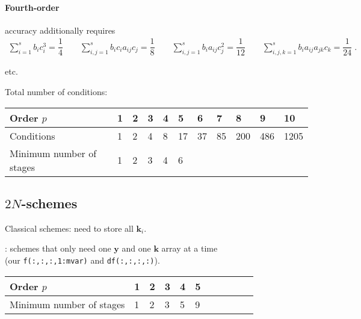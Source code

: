 \documentclass[\mydriver,12pt,twoside,notitlepage]{article}
\newcommand{\Black}{\color{black}}
\newcommand{\Code}[1]{{\color{DarkishMagenta}\texttt{#1}}}
\newcommand{\kv}      {\mathbf{k}}
\newcommand{\yv}{\mathbf{y}}
\begin{document}
%
\paragraph{Fourth-order} accuracy additionally requires
\begin{eqnarray}
  \sum\limits_{i=1}^{s} b_{i} c_i^3                  =  \dfrac{1}{4}
  \qquad
  \sum\limits_{i,j=1}^{s} b_{i} c_{i} a_{ij} c_j     =  \dfrac{1}{8}
  \qquad
  \sum\limits_{i,j=1}^{s} b_{i} a_{ij} c_j^2         =  \dfrac{1}{12}
  \qquad
  \sum\limits_{i,j,k=1}^{s} b_{i} a_{ij} a_{jk} c_k  =  \dfrac{1}{24} \; .  
\end{eqnarray}

\medskip
etc.

\bigskip

Total number of conditions:
\medskip
\begin{center}
  \begin{tabular}{lllllllllll}
  \toprule
    \Black Order $p$
        & 1 & 2 & 3 & 4 &  5 &  6 &  7 &   8 &  9  &   10\\
  \midrule
    \Black Conditions
        & 1 & 2 & 4 & 8 & 17 & 37 & 85 & 200 & 486 & 1205\\
  \midrule
    \Black Minimum number of stages
        & 1 & 2 & 3 & 4 & 6 & \\
  \bottomrule
  \end{tabular}
\end{center}


\subsection{$2N$-schemes}

Classical schemes: need to store all $\kv_i$.

\medskip

\cite{Williamson:LowStorage}: schemes that only need one $\yv$ and one
$\kv$ array at a time\\
(our \Code{f(:,:,:,1:mvar)} and \Code{df(:,:,:,:)}).

\medskip

\begin{center}
  \begin{tabular}{lllllllllll}
  \toprule
    Order $p$  & 1 & 2 & 3 & 4 & 5 \\
  \midrule
    Minimum number of stages & 1 & 2 & 3 & 5 & 9 & \\
  \bottomrule
  \end{tabular}
\end{center}
\end{document}

